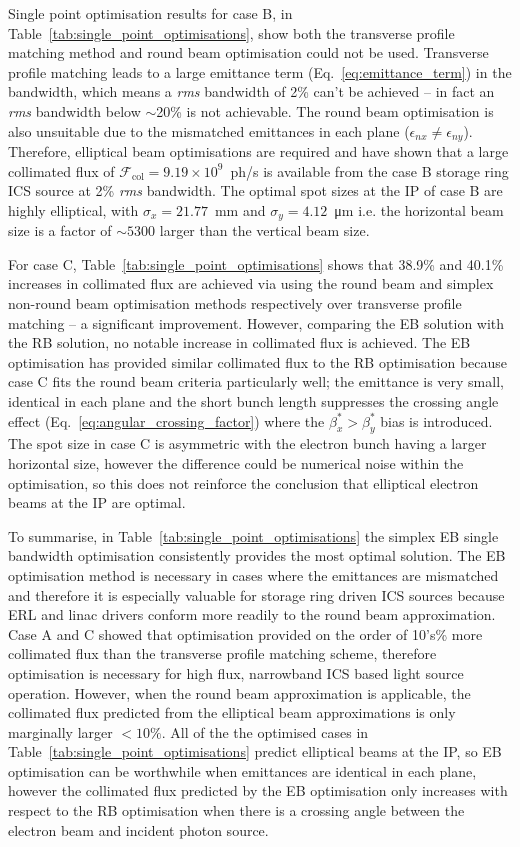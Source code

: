 \documentclass[../main.tex]{subfiles}
\begin{document}
Single point optimisation results for case B, in Table~\ref{tab:single_point_optimisations}, show both the transverse profile matching method and round beam optimisation could not be used. Transverse profile matching leads to a large emittance term (Eq.~\ref{eq:emittance_term}) in the bandwidth, which means a \textit{rms} bandwidth of 2\% can't be achieved -- in fact an \textit{rms} bandwidth below $\sim$20\% is not achievable. The round beam optimisation is also unsuitable due to the mismatched emittances in each plane ($\epsilon_{nx}\neq\epsilon_{ny}$). Therefore, elliptical beam optimisations are required and have shown that a large collimated flux of $\mathcal{F}_{\mathrm{col}} = 9.19\times 10^{9}$~ph/\si{\second} is available from the case B storage ring ICS source at 2\% \textit{rms} bandwidth. The optimal spot sizes at the IP of case B are highly elliptical, with $\sigma_{x} = 21.77$~\si{\milli\meter} and $\sigma_{y} = 4.12$~\si{\micro\meter} i.e. the horizontal beam size is a factor of $\sim 5300$ larger than the vertical beam size.

For case C, Table~\ref{tab:single_point_optimisations} shows that 38.9\% and 40.1\% increases in collimated flux are achieved via using the round beam and simplex non-round beam optimisation methods respectively over transverse profile matching -- a significant improvement. However, comparing the EB solution with the RB solution, no notable increase in collimated flux is achieved. The EB optimisation has provided similar collimated flux to the RB optimisation because case C fits the round beam criteria particularly well; the emittance is very small, identical in each plane and the short bunch length suppresses the crossing angle effect (Eq.~\ref{eq:angular_crossing_factor}) where the $\beta_{x}^{*} > \beta_{y}^{*}$ bias is introduced. The spot size in case C is asymmetric with the electron bunch having a larger horizontal size, however the difference could be numerical noise within the optimisation, so this does not reinforce the conclusion that elliptical electron beams at the IP are optimal.

To summarise, in Table~\ref{tab:single_point_optimisations} the simplex EB single bandwidth optimisation consistently provides the most optimal solution. The EB optimisation method is necessary in cases where the emittances are mismatched and therefore it is especially valuable for storage ring driven ICS sources because ERL and linac drivers conform more readily to the round beam approximation. Case A and C showed that optimisation provided on the order of 10's\% more collimated flux than the transverse profile matching scheme, therefore optimisation is necessary for high flux, narrowband ICS based light source operation. However, when the round beam approximation is applicable, the collimated flux predicted from the elliptical beam approximations is only marginally larger $< 10\%$. All of the the optimised cases in Table~\ref{tab:single_point_optimisations} predict elliptical beams at the IP, so EB optimisation can be worthwhile when emittances are identical in each plane, however the collimated flux predicted by the EB optimisation only increases with respect to the RB optimisation when there is a crossing angle between the electron beam and incident photon source. 
\end{document}

